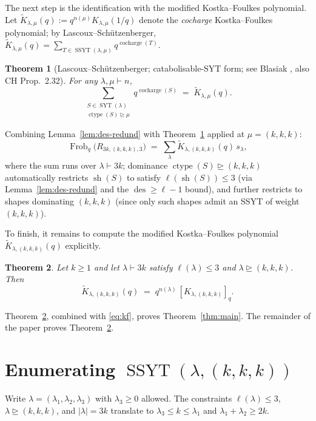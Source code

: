 \documentclass[11pt]{article}
\newtheorem{theorem}{Theorem}
\theoremstyle{definition}
\theoremstyle{remark}
\DeclareMathOperator{\Frob}{Frob}
\DeclareMathOperator{\ctype}{ctype}
\DeclareMathOperator{\cocharge}{cocharge}
\DeclareMathOperator{\des}{des}
\DeclareMathOperator{\sh}{sh}
\DeclareMathOperator{\SYT}{SYT}
\DeclareMathOperator{\SSYT}{SSYT}
\newcommand{\dom}{\trianglerighteq}
\begin{document}
The next step is the identification with the modified Kostka--Foulkes
polynomial. Let $\widetilde K_{\lambda,\mu}(q) := q^{n(\mu)}
K_{\lambda,\mu}(1/q)$ denote the \emph{cocharge} Kostka--Foulkes polynomial;
by Lascoux--Sch\"utzenberger,
$\widetilde K_{\lambda,\mu}(q) = \sum_{T\in\SSYT(\lambda,\mu)}
q^{\cocharge(T)}$.

\begin{theorem}[Lascoux--Sch\"utzenberger; catabolisable-SYT form;
see Blasiak {\cite[Prop.~2.19]{blasiak-cyclage}}, also CH Prop.~2.32]
\label{thm:LS}
For any $\lambda,\mu \vdash n$,
\[
    \sum_{\substack{S\in\SYT(\lambda)\\ \ctype(S)\dom \mu}}
        q^{\cocharge(S)}
    \;=\; \widetilde K_{\lambda,\mu}(q).
\]
\end{theorem}

Combining Lemma~\ref{lem:des-redund} with Theorem~\ref{thm:LS} applied at
$\mu = (k,k,k)$:
\begin{equation}\label{eq:kf}
    \Frob_q\bigl(R_{3k,(k,k,k),3}\bigr)
    \;=\;
    \sum_{\lambda} \widetilde K_{\lambda,(k,k,k)}(q)\, s_\lambda,
\end{equation}
where the sum runs over $\lambda \vdash 3k$; dominance
$\ctype(S) \dom (k,k,k)$ automatically restricts $\sh(S)$ to satisfy
$\ell(\sh(S)) \le 3$ (via Lemma~\ref{lem:des-redund} and the
$\des \ge \ell - 1$ bound), and further restricts to shapes dominating
$(k,k,k)$ (since only such shapes admit an SSYT of weight $(k,k,k)$).

\medskip

To finish, it remains to compute the modified Kostka--Foulkes polynomial
$\widetilde K_{\lambda,(k,k,k)}(q)$ explicitly.

\begin{theorem}\label{thm:KF-closed}
Let $k \ge 1$ and let $\lambda \vdash 3k$ satisfy $\ell(\lambda) \le 3$ and
$\lambda \dom (k,k,k)$. Then
\[
    \widetilde K_{\lambda,(k,k,k)}(q)
    \;=\;
    q^{n(\lambda)}\, [K_{\lambda,(k,k,k)}]_q.
\]
\end{theorem}

Theorem~\ref{thm:KF-closed}, combined with \eqref{eq:kf}, proves
Theorem~\ref{thm:main}. The remainder of the paper proves
Theorem~\ref{thm:KF-closed}.

\section{Enumerating $\SSYT(\lambda,(k,k,k))$}

Write $\lambda = (\lambda_1,\lambda_2,\lambda_3)$ with $\lambda_3 \ge 0$
allowed. The constraints $\ell(\lambda) \le 3$, $\lambda \dom (k,k,k)$, and
$|\lambda| = 3k$ translate to $\lambda_3 \le k \le \lambda_1$ and
$\lambda_1 + \lambda_2 \ge 2k$.
\end{document}
